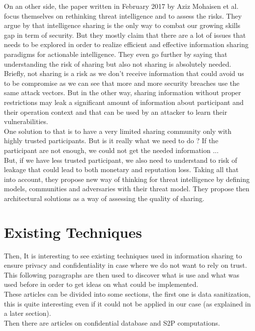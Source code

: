\documentclass{eplmastersthesis}
\begin{document}
On an other side, the paper written in February 2017 by Aziz Mohaisen et al. \cite{mohaisen2017rethinking} focus themselves on rethinking threat intelligence and to assess the risks. They argue by \cite{MalikThreat} that intelligence sharing is the only way to combat our growing skills gap in term of security. But they mostly claim that there are a lot of issues that needs to be explored in order to realize efficient and effective information sharing paradigms for actionable intelligence. They even go further by saying that understanding the risk of sharing but also not sharing is absolutely needed.\\
Briefly, not sharing is a risk as we don't receive information that could avoid us to be compromise as we can see that more and more security breaches use the same attack vectors. But in the other way, sharing information without proper restrictions may leak a significant amount of information about participant and their operation context and that can be used by an attacker to learn their vulnerabilities.\\
One solution to that is to have a very limited sharing community only with highly trusted participants. But is it really what we need to do ? If the participant are not enough, we could not get the needed information ...\\
But, if we have less trusted participant, we also need to understand to risk of leakage that could lead to both monetary and reputation loss. Taking all that into account, they propose new way of thinking for threat intelligence by defining models, communities and adversaries with their threat model.
They propose then architectural solutions as a way of assessing the quality of sharing.

\section{Existing Techniques}
Then, It is interesting to see existing techniques used in information sharing to ensure privacy and confidentiality in case where we do not want to rely on trust. This following paragraphs are then used to discover what is use and what was used before in order to get ideas on what could be implemented.\\

These articles can be divided into some sections, the first one is data sanitization, this is quite interesting even if it could not be applied in our case (as explained in a later section).\\
Then there are articles on confidential database and S2P computations.\\
\end{document}
